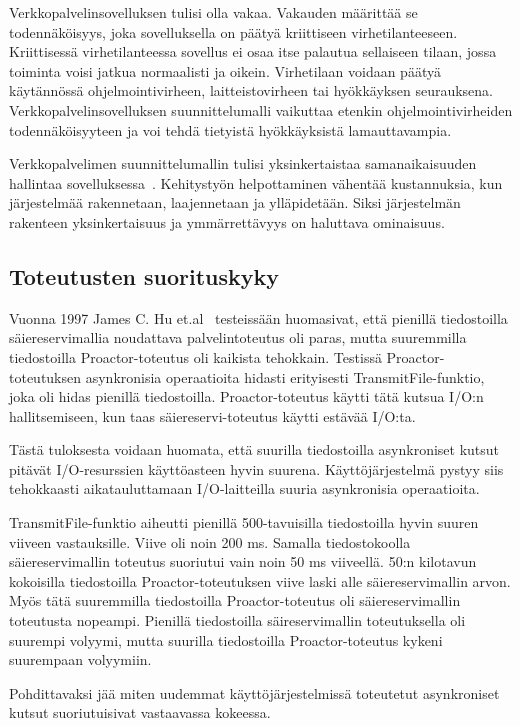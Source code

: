 \documentclass[finnish]{tktltiki2}%
\theoremstyle{definition}
\theoremstyle{remark}
\begin{document}
Verkkopalvelinsovelluksen tulisi
olla vakaa. Vakauden määrittää
se todennäköisyys, joka sovelluksella on
päätyä kriittiseen virhetilanteeseen. Kriittisessä
virhetilanteessa sovellus ei osaa
itse palautua sellaiseen tilaan, jossa
toiminta voisi jatkua normaalisti ja oikein.
Virhetilaan voidaan päätyä käytännössä
ohjelmointivirheen, laitteistovirheen tai hyökkäyksen seurauksena.
Verkkopalvelinsovelluksen suunnittelumalli
vaikuttaa etenkin ohjelmointivirheiden todennäköisyyteen
ja voi tehdä tietyistä hyökkäyksistä lamauttavampia.


Verkkopalvelimen suunnittelumallin tulisi
yksinkertaistaa samanaikaisuuden hallintaa sovelluksessa~\cite{hu_applying_1998}.
Kehitystyön helpottaminen vähentää kustannuksia,
kun järjestelmää rakennetaan, laajennetaan ja ylläpidetään.
Siksi järjestelmän rakenteen yksinkertaisuus ja
ymmärrettävyys on haluttava ominaisuus.

\subsection{Toteutusten suorituskyky}
Vuonna 1997 James C. Hu et.al~\cite{hu_measuring_1997} testeissään huomasivat,
että pienillä tiedostoilla säiereservimallia noudattava palvelintoteutus oli paras,
mutta suuremmilla tiedostoilla Proactor-toteutus oli kaikista tehokkain.
Testissä Proactor-toteutuksen asynkronisia operaatioita hidasti
erityisesti TransmitFile-funktio, joka oli
hidas pienillä tiedostoilla.
Proactor-toteutus käytti tätä kutsua I/O:n hallitsemiseen,
kun taas säiereservi-toteutus käytti estävää I/O:ta.

Tästä tuloksesta voidaan huomata,
että suurilla tiedostoilla asynkroniset kutsut
pitävät I/O-resurssien käyttöasteen hyvin suurena.
Käyttöjärjestelmä pystyy siis tehokkaasti aikatauluttamaan
I/O-laitteilla suuria asynkronisia operaatioita.

TransmitFile-funktio aiheutti pienillä 500-tavuisilla tiedostoilla hyvin suuren viiveen
vastauksille. Viive oli noin 200 ms. Samalla tiedostokoolla säiereservimallin toteutus
suoriutui vain noin 50 ms viiveellä.
50:n kilotavun kokoisilla tiedostoilla Proactor-toteutuksen
viive laski alle säiereservimallin arvon.
Myös tätä suuremmilla tiedostoilla Proactor-toteutus oli säiereservimallin toteutusta nopeampi.
Pienillä tiedostoilla säireservimallin toteutuksella oli suurempi
volyymi, mutta suurilla tiedostoilla Proactor-toteutus
kykeni suurempaan volyymiin.

Pohdittavaksi jää miten uudemmat käyttöjärjestelmissä
toteutetut asynkroniset kutsut suoriutuisivat 
vastaavassa kokeessa.
\end{document}
